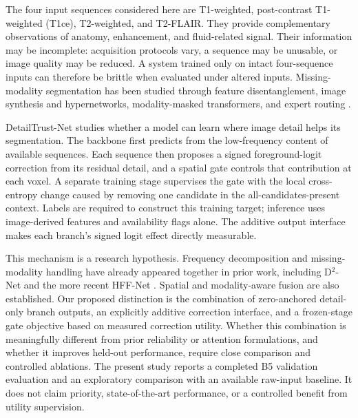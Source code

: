 \documentclass[conference]{IEEEtran}
\begin{document}
The four input sequences considered here are T1-weighted, post-contrast T1-weighted (T1ce), T2-weighted, and T2-FLAIR. They provide complementary observations of anatomy, enhancement, and fluid-related signal. Their information may be incomplete: acquisition protocols vary, a sequence may be unusable, or image quality may be reduced. A system trained only on intact four-sequence inputs can therefore be brittle when evaluated under altered inputs. Missing-modality segmentation has been studied through feature disentanglement, image synthesis and hypernetworks, modality-masked transformers, and expert routing \cite{yang2022d2,yang2023hyper,shi2024m2f,zhang2025mome}.

DetailTrust-Net studies whether a model can learn where image detail helps its segmentation. The backbone first predicts from the low-frequency content of available sequences. Each sequence then proposes a signed foreground-logit correction from its residual detail, and a spatial gate controls that contribution at each voxel. A separate training stage supervises the gate with the local cross-entropy change caused by removing one candidate in the all-candidates-present context. Labels are required to construct this training target; inference uses image-derived features and availability flags alone. The additive output interface makes each branch's signed logit effect directly measurable.

This mechanism is a research hypothesis. Frequency decomposition and missing-modality handling have already appeared together in prior work, including D$^2$-Net and the more recent HFF-Net \cite{yang2022d2,shao2025hff}. Spatial and modality-aware fusion are also established. Our proposed distinction is the combination of zero-anchored detail-only branch outputs, an explicitly additive correction interface, and a frozen-stage gate objective based on measured correction utility. Whether this combination is meaningfully different from prior reliability or attention formulations, and whether it improves held-out performance, require close comparison and controlled ablations. The present study reports a completed B5 validation evaluation and an exploratory comparison with an available raw-input baseline. It does not claim priority, state-of-the-art performance, or a controlled benefit from utility supervision.
\end{document}
